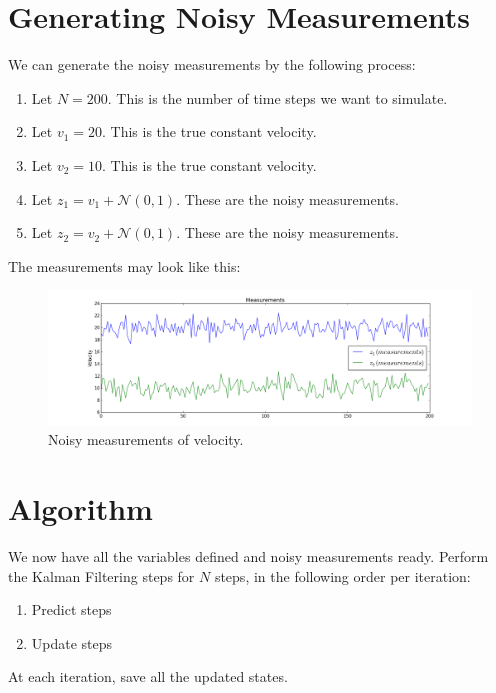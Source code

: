 \documentclass{article}
\begin{document}
\section{Generating Noisy Measurements}
We can generate the noisy measurements by the following process:

\begin{enumerate}
    \item Let $N = 200$. This is the number of time steps we want to simulate.
    \item Let $v_1 = 20$. This is the true constant velocity.
    \item Let $v_2 = 10$. This is the true constant velocity.
    \item Let $z_1 = v_1 + \mathcal {N}(0,1)$. These are the noisy measurements.
    \item Let $z_2 = v_2 + \mathcal {N}(0,1)$. These are the noisy measurements.
\end{enumerate}
    
The measurements may look like this:

\begin{figure}[H]
  \includegraphics[width=\linewidth]{measurements.png}
  \caption{Noisy measurements of velocity.}
  \label{fig:m1}
\end{figure}

\section{Algorithm}

We now have all the variables defined and noisy measurements ready. Perform the Kalman Filtering steps for $N$ steps, in the following order per iteration:

\begin{enumerate}
    \item Predict steps
    \item Update steps
\end{enumerate}

At each iteration, save all the updated states.
\end{document}
